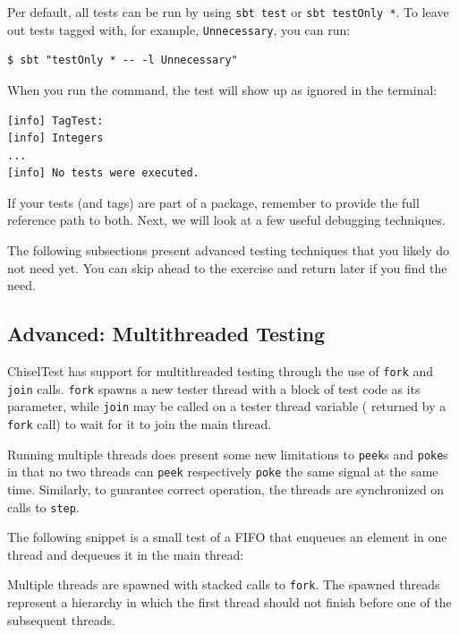 \documentclass[%
    10pt,
    headinclude, footexclude,
    openright, %
    notitlepage,
    cleardoubleempty,
    headsepline,
    pointlessnumbers,
    bibtotoc, idxtotoc,
    ]{scrbook}
\newcommand{\code}[1]{{\small{\texttt{#1}}}}
\begin{document}

\noindent Per default, all tests can be run by using \code{sbt test} or \code{sbt testOnly *}. 
To leave out tests tagged with, for example, \code{Unnecessary}, you can run:

\begin{verbatim}
$ sbt "testOnly * -- -l Unnecessary"
\end{verbatim}

\noindent When you run the command, the test will show up as ignored in the terminal:

\begin{verbatim}
[info] TagTest:
[info] Integers
...
[info] No tests were executed.
\end{verbatim}

\noindent If your tests (and tags) are part of a package, remember to provide the full 
reference path to both. Next, we will look at a few useful debugging techniques.


The following subsections present advanced testing techniques that you likely do 
not need yet. You can skip ahead to the exercise and return later if you find the need.

\subsection{Advanced: Multithreaded Testing}

ChiselTest has support for multithreaded testing through the use of \code{fork} and 
\code{join} calls. \code{fork} spawns a new tester thread with a block of test code 
as its parameter, while \code{join} may be called on a tester thread variable (
returned by a \code{fork} call) to wait for it to join the main thread. 

Running multiple threads does present some new limitations to \code{peek}s and 
\code{poke}s in that no two threads can \code{peek} respectively \code{poke} the 
same signal at the same time. Similarly, to guarantee correct operation, the threads 
are synchronized on calls to \code{step}.

The following snippet is a small test of a FIFO that enqueues an element in one thread 
and dequeues it in the main thread:


Multiple threads are spawned with stacked calls to \code{fork}. The spawned threads 
represent a hierarchy in which the first thread should not finish before one of the 
subsequent threads.
\end{document}

